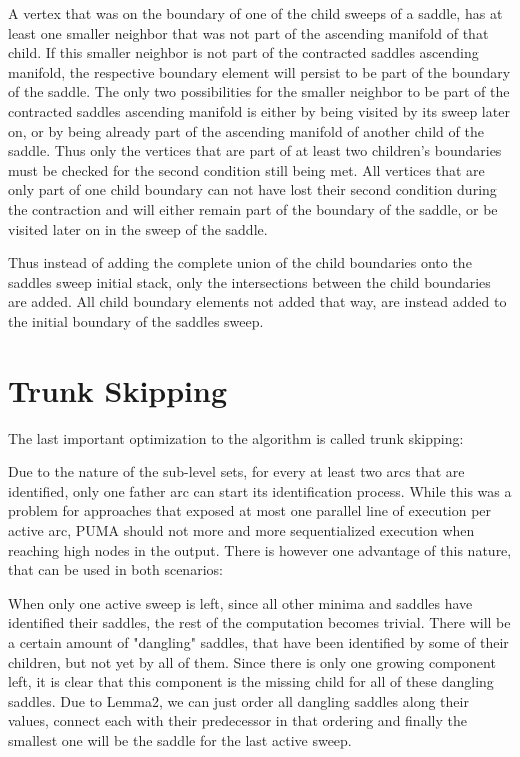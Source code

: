 \documentclass[%
	paper=A4,					%
	twoside=true,				%
	openright,					%
	parskip=full,				%
	chapterprefix=true,			%
	11pt,						%
	headings=normal,			%
	bibliography=totoc,			%
	listof=totoc,				%
	titlepage=on,				%
	captions=tableabove,		%
	draft=false,				%
]{scrreprt}%
\begin{document}
A vertex that was on the boundary of one of the child sweeps of a saddle, has at least one smaller neighbor that was not part of the ascending manifold of that child. If this smaller neighbor is not part of the contracted saddles ascending manifold, the respective boundary element will persist to be part of the boundary of the saddle. The only two possibilities for the smaller neighbor to be part of the contracted saddles ascending manifold is either by being visited by its sweep later on, or by being already part of the ascending manifold of another child of the saddle. Thus only the vertices that are part of at least two children's boundaries must be checked for the second condition still being met. All vertices that are only part of one child boundary can not have lost their second condition during the contraction and will either remain part of the boundary of the saddle, or be visited later on in the sweep of the saddle.  

Thus instead of adding the complete union of the child boundaries onto the saddles sweep initial stack, only the intersections between the child boundaries are added. All child boundary elements not added that way, are instead added to the initial boundary of the saddles sweep.

\section{Trunk Skipping}
The last important optimization to the algorithm is called trunk skipping:

Due to the nature of the sub-level sets, for every at least two arcs that are identified, only one father arc can start its identification process. While this was a problem for approaches that exposed at most one parallel line of execution per active arc, PUMA should not  more and more sequentialized execution when reaching high nodes in the output. There is however one advantage of this nature, that can be used in both scenarios:

When only one active sweep is left, since all other minima and saddles have identified their saddles, the rest of the computation becomes trivial. There will be a certain amount of "dangling" saddles, that have been identified by some of their children, but not yet by all of them. Since there is only one growing component left, it is clear that this component is the missing child for all of these dangling saddles. Due to Lemma2, we can just order all dangling saddles along their values, connect each with their predecessor in that ordering and finally the smallest one will be the saddle for the last active sweep. 
\end{document}
